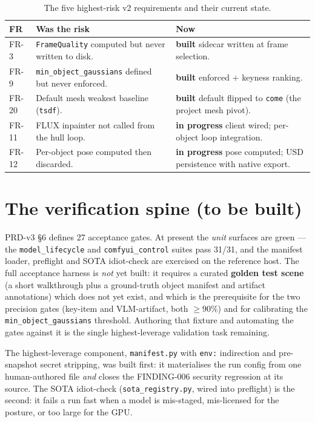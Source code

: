\documentclass[a4paper,11pt]{report}
\newcommand{\chip}[2]{\textcolor{#1}{\textbf{#2}}}
\newcommand{\code}[1]{\texttt{#1}}
\newcommand{\built}{\chip{SuccessGreen}{built}}
\newcommand{\wip}{\chip{WarningAmber}{in progress}}
\begin{document}
\begin{table}[h]
\centering\small
\caption{The five highest-risk v2 requirements and their current state.}\label{tab:topgaps}
\begin{tabularx}{\textwidth}{l L{0.40\textwidth} L{0.34\textwidth}}
\toprule
\textbf{FR} & \textbf{Was the risk} & \textbf{Now} \\
\midrule
FR-3  & \code{FrameQuality} computed but never written to disk. & \built{} sidecar written at frame selection. \\
FR-9  & \code{min\_object\_gaussians} defined but never enforced. & \built{} enforced + keyness ranking. \\
FR-20 & Default mesh weakest baseline (\code{tsdf}). & \built{} default flipped to \code{come} (the project mesh pivot). \\
FR-11 & FLUX inpainter not called from the hull loop. & \wip{} client wired; per-object loop integration. \\
FR-12 & Per-object pose computed then discarded. & \wip{} pose computed; USD persistence with native export. \\
\bottomrule
\end{tabularx}
\end{table}

\section{The verification spine (to be built)}
PRD-v3 \S6 defines 27 acceptance gates. At present the \emph{unit} surfaces are green — the
\code{model\_lifecycle} and \code{comfyui\_control} suites pass 31/31, and the manifest loader,
preflight and SOTA idiot-check are exercised on the reference host. The full acceptance harness is
\emph{not} yet built: it requires a curated \textbf{golden test scene} (a short walkthrough plus a
ground-truth object manifest and artifact annotations) which does not yet exist, and which is the
prerequisite for the two precision gates (key-item and VLM-artifact, both $\geq 90\%$) and for
calibrating the \code{min\_object\_gaussians} threshold. Authoring that fixture and automating the gates
against it is the single highest-leverage validation task remaining.

\begin{keyfinding}
The highest-leverage component, \code{manifest.py} with \code{env:} indirection and pre-snapshot secret
stripping, was built first: it materialises the run config from one human-authored file \emph{and}
closes the FINDING-006 security regression at its source. The SOTA idiot-check
(\code{sota\_registry.py}, wired into preflight) is the second: it fails a run fast when a model is
mis-staged, mis-licensed for the posture, or too large for the GPU.
\end{keyfinding}
\end{document}
